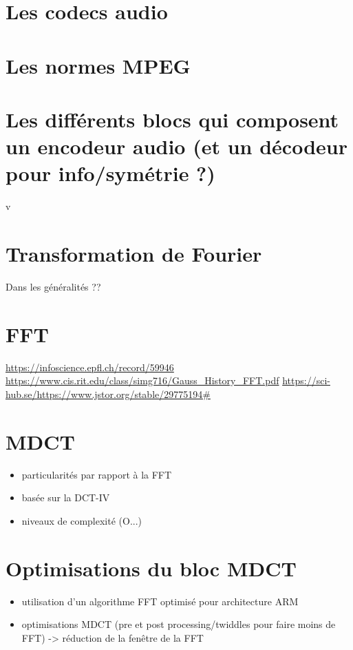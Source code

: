 \documentclass{article}
\begin{document}
    \section{Les codecs audio}
    \section{Les normes MPEG}
    \section{Les différents blocs qui composent un encodeur audio (et un décodeur pour info/symétrie ?)}v
    
    \section{Transformation de Fourier}
    Dans les généralités ??
    

    \section{FFT}
    \url{https://infoscience.epfl.ch/record/59946}
    \url{https://www.cis.rit.edu/class/simg716/Gauss_History_FFT.pdf}
    \url{https://sci-hub.se/https://www.jstor.org/stable/29775194#}

    \section{MDCT}
    \begin{itemize}
        \item particularités par rapport à la FFT
        \item basée sur la DCT-IV
        \item niveaux de complexité (O...)
    \end{itemize}

    \section{Optimisations du bloc MDCT}
    \begin{itemize}
        \item utilisation d'un algorithme FFT optimisé pour architecture ARM
        \item optimisations MDCT (pre et post processing/twiddles pour faire moins de FFT) -> réduction de la fenêtre de la FFT
    \end{itemize}
\end{document}
